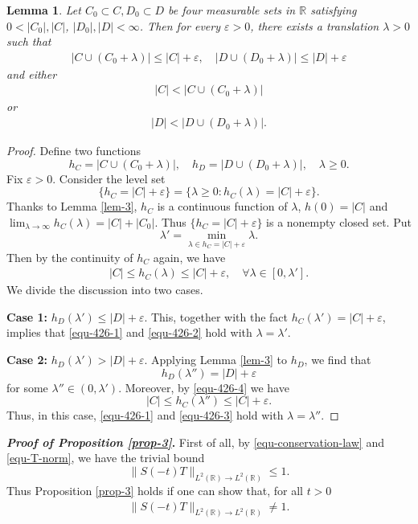 \documentclass[preprint,12pt]{elsarticle}
\def\R {\mathbb{R}}
\newtheorem{lemma}{Lemma}[section]
\begin{document}
\begin{lemma}\label{lem-4}
Let $C_0\subset C, D_0\subset D$ be four measurable sets in $\mathbb{R}$ satisfying $0<|C_0|, |C|$, $|D_0|, |D|<\infty$. Then for every $\varepsilon>0$, there  exists a translation $\lambda>0$ such that
\begin{align}\label{equ-426-1}
   |C\cup (C_0+\lambda)|\leq|C|+\varepsilon, \quad    |D\cup (D_0+\lambda)|\leq|D|+\varepsilon
\end{align}
and either
\begin{align}\label{equ-426-2}
  |C|<|C\cup (C_0+\lambda)|
\end{align}
or
\begin{align}\label{equ-426-3}
 |D|< |D\cup (D_0+\lambda)|.
\end{align}
\end{lemma}
\begin{proof}
Define two functions
$$
h_C=|C\cup (C_0+\lambda)|, \quad h_D=|D\cup (D_0+\lambda)|, \quad \lambda\geq 0.
$$
Fix $\varepsilon>0$. Consider the level set
$$
\{h_C=|C|+\varepsilon\}=\{\lambda\geq 0: h_C(\lambda)=|C|+\varepsilon\}.
$$
Thanks to Lemma \ref{lem-3}, $h_C$ is a continuous function of $\lambda$, $h(0)=|C|$ and $\lim_{\lambda\to \infty}\limits h_C(\lambda)=|C|+|C_0|$. Thus $\{h_C=|C|+\varepsilon\}$ is a nonempty closed set. Put
$$
\lambda'=\min_{\lambda\in h_C=|C|+\varepsilon} \lambda.
$$
Then by the continuity of $h_C$ again, we have
\begin{align}\label{equ-426-4}
|C|\leq h_C(\lambda)\leq|C|+\varepsilon, \quad \forall \lambda\in[0,\lambda'].
\end{align}
We divide the discussion into two cases.

{\bf Case 1:} $h_D(\lambda')\leq |D|+\varepsilon$. This, together with the fact $h_C(\lambda')=|C|+\varepsilon$, implies that \eqref{equ-426-1} and \eqref{equ-426-2} hold with $\lambda=\lambda'$.

{\bf Case 2:} $h_D(\lambda')>|D|+\varepsilon$. Applying Lemma \ref{lem-3} to $h_D$, we find that
$$
 h_D(\lambda'')=|D|+\varepsilon
$$
for some $\lambda''\in(0,\lambda')$. Moreover, by \eqref{equ-426-4} we have
$$
|C|\leq h_C(\lambda'')\leq|C|+\varepsilon.
$$
Thus, in this case, \eqref{equ-426-1} and \eqref{equ-426-3} hold with $\lambda=\lambda''$.
\end{proof}



{\bf \textit{Proof of Proposition \ref{prop-3}}.} %
First of all, by \eqref{equ-conservation-law} and \eqref{equ-T-norm}, we have the trivial bound
$$
\|S(-t)T\|_{L^2(\R)\to L^2(\R)}\leq 1.
$$
Thus Proposition \ref{prop-3} holds if one can show that, for all $t>0$
\begin{align}\label{equ-4-23-1}
\|S(-t)T\|_{L^2(\R)\to L^2(\R)}\neq 1.
\end{align}
\end{document}
